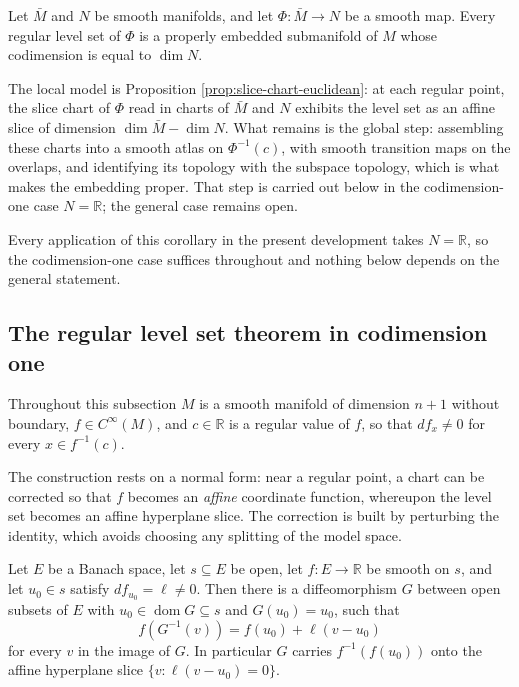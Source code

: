 \begin{corollary}
\label{cor:regular-level-set}
Let $\bar{M}$ and $N$ be smooth manifolds, and let $\Phi: \bar{M} \to N$ be a smooth map. Every regular level set of $\Phi$ is a properly embedded submanifold of $M$ whose codimension is equal to $\dim N$.
\end{corollary}

The local model is Proposition \ref{prop:slice-chart-euclidean}: at each regular point, the slice chart of $\Phi$ read in charts of $\bar{M}$ and $N$ exhibits the level set as an affine slice of dimension $\dim \bar{M} - \dim N$. What remains is the global step: assembling these charts into a smooth atlas on $\Phi^{-1}(c)$, with smooth transition maps on the overlaps, and identifying its topology with the subspace topology, which is what makes the embedding proper. That step is carried out below in the codimension-one case $N = \mathbb{R}$; the general case remains open.

Every application of this corollary in the present development takes $N = \mathbb{R}$, so the codimension-one case suffices throughout and nothing below depends on the general statement.

\subsection*{The regular level set theorem in codimension one}

Throughout this subsection $M$ is a smooth manifold of dimension $n+1$ without boundary, $f \in C^\infty(M)$, and $c \in \mathbb{R}$ is a regular value of $f$, so that $df_x \neq 0$ for every $x \in f^{-1}(c)$.

The construction rests on a normal form: near a regular point, a chart can be corrected so that $f$ becomes an \emph{affine} coordinate function, whereupon the level set becomes an affine hyperplane slice. The correction is built by perturbing the identity, which avoids choosing any splitting of the model space.

\begin{lemma}
\label{lem:straighten-scalar-affine}
\leanok
Let $E$ be a Banach space, let $s \subseteq E$ be open, let $f : E \to \mathbb{R}$ be smooth on $s$, and let $u_0 \in s$ satisfy $df_{u_0} = \ell \neq 0$. Then there is a diffeomorphism $G$ between open subsets of $E$ with $u_0 \in \operatorname{dom} G \subseteq s$ and $G(u_0) = u_0$, such that
\[
  f(G^{-1}(v)) = f(u_0) + \ell(v - u_0)
\]
for every $v$ in the image of $G$. In particular $G$ carries $f^{-1}(f(u_0))$ onto the affine hyperplane slice $\{v : \ell(v - u_0) = 0\}$.
\end{lemma}

